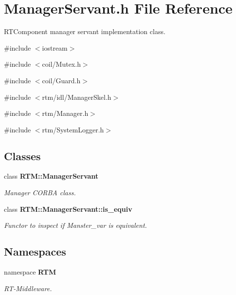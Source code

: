 \section{ManagerServant.h File Reference}
\label{ManagerServant_8h}


RTComponent manager servant implementation class.  


{\ttfamily \#include $<$iostream$>$}\par
{\ttfamily \#include $<$coil/Mutex.h$>$}\par
{\ttfamily \#include $<$coil/Guard.h$>$}\par
{\ttfamily \#include $<$rtm/idl/ManagerSkel.h$>$}\par
{\ttfamily \#include $<$rtm/Manager.h$>$}\par
{\ttfamily \#include $<$rtm/SystemLogger.h$>$}\par
\subsection*{Classes}
\begin{DoxyCompactItemize}
\item 
class {\bf RTM::ManagerServant}
\begin{DoxyCompactList}\small\item\em Manager CORBA class. \item\end{DoxyCompactList}\item 
class {\bfseries RTM::ManagerServant::is\_\-equiv}
\begin{DoxyCompactList}\small\item\em Functor to inspect if Manster\_\-var is equivalent. \item\end{DoxyCompactList}\end{DoxyCompactItemize}
\subsection*{Namespaces}
\begin{DoxyCompactItemize}
\item 
namespace {\bf RTM}


\begin{DoxyCompactList}\small\item\em RT-\/Middleware. \item\end{DoxyCompactList}

\end{DoxyCompactItemize}


